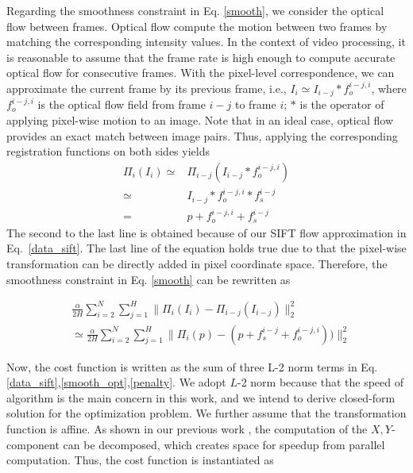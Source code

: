 \documentclass[10pt,journal]{IEEEtran}
\begin{document}

Regarding the smoothness constraint in Eq. \ref{smooth}, we consider the optical flow between frames. Optical flow compute the motion between two frames by matching the corresponding intensity values. In the context of video processing, it is reasonable to assume that the frame rate is high enough to compute accurate optical flow for consecutive frames. \textcolor[rgb]{1,0,0}{With the pixel-level correspondence, we can approximate the current frame by its previous frame, i.e., $I_i\simeq I_{i-j}*f_o^{i-j,i}$, where $f_o^{i-j,i}$ is the optical flow field from frame $i-j$ to frame $i$; $*$ is the operator of applying pixel-wise motion to an image. Note that in an ideal case, optical flow provides an exact match between image pairs. Thus, applying the corresponding registration functions on both sides yields 
\begin{align}
\Pi_i(I_i) \simeq & \Pi_{i-j}(I_{i-j}*f_o^{i-j,i}) \nonumber \\
					\simeq & I_{i-j}*f_o^{i-j,i}*f_s^{i-j} \nonumber \\
					= & p+f_o^{i-j,i}+f_s^{i-j}	\nonumber
\end{align}
The second to the last line is obtained because of our SIFT flow approximation in Eq.~\ref{data_sift}. The last line of the equation holds true due to that the pixel-wise transformation can be directly added in pixel coordinate space. }Therefore, the smoothness constraint in Eq. \ref{smooth} can be rewritten as 

\begin{align}
\label{smooth_opt}
&\frac{\alpha}{2H}\sum_{i=2}^{N}\sum_{j=1}^{H}\parallel{\Pi_i(I_i)-\Pi_{i-j}(I_{i-j})}\parallel_2^2 \nonumber \\
&\simeq\frac{\alpha}{2H}\sum_{i=2}^{N}\sum_{j=1}^{H}\parallel{\Pi_i(p)-(p+f_s^{i-j}+f_o^{i-j,i}))}\parallel_2^2
\end{align}

Now, the cost function is written as the sum of three L-2 norm terms in Eq. \ref{data_sift},\ref{smooth_opt},\ref{penalty}. We adopt $L$-2 norm because that the speed of algorithm is the main concern in this work, and we intend to derive closed-form solution for the optimization problem. We further assume that the transformation function is affine. As shown in our previous work \cite{Yang_FG13}, the computation of the $X,Y$-component can be decomposed, which creates space for speedup from parallel computation. Thus, the cost function is instantiated as
\end{document}

